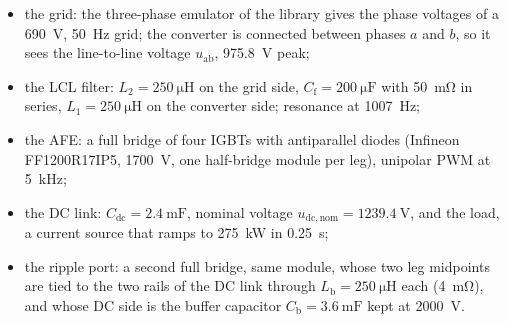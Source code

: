\documentclass[11pt,a4paper]{scrartcl}
\newcommand{\ped}[1]{_{\mathrm{#1}}}
\begin{document}
\begin{onehalfspace}
\begin{itemize}[nosep]
	\item the grid: the three-phase emulator of the library gives the phase voltages of a \SI{690}{\volt}, \SI{50}{\hertz} grid; the converter is connected between phases $a$ and $b$, so it sees the line-to-line voltage $u\ped{ab}$, \SI{975.8}{\volt} peak;
	\item the LCL filter: $L_2 = \SI{250}{\micro\henry}$ on the grid side, $C\ped{f} = \SI{200}{\micro\farad}$ with \SI{50}{\milli\ohm} in series, $L_1 = \SI{250}{\micro\henry}$ on the converter side; resonance at \SI{1007}{\hertz};
	\item the AFE: a full bridge of four IGBTs with antiparallel diodes (Infineon FF1200R17IP5, \SI{1700}{\volt}, one half-bridge module per leg), unipolar PWM at \SI{5}{\kilo\hertz};
	\item the DC link: $C\ped{dc} = \SI{2.4}{\milli\farad}$, nominal voltage $u\ped{dc,nom} = \SI{1239.4}{\volt}$, and the load, a current source that ramps to \SI{275}{\kilo\watt} in \SI{0.25}{\second};
	\item the ripple port: a second full bridge, same module, whose two leg midpoints are tied to the two rails of the DC link through $L\ped{b} = \SI{250}{\micro\henry}$ each (\SI{4}{\milli\ohm}), and whose DC side is the buffer capacitor $C\ped{b} = \SI{3.6}{\milli\farad}$ kept at \SI{2000}{\volt}.
\end{itemize}


\end{onehalfspace}
\end{document}
